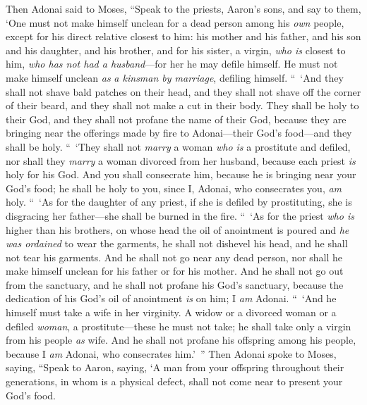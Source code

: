 \begin{biblechapter} %
 Then Adonai said to Moses, “Speak to the priests, Aaron’s sons, and say to them, ‘One must not make himself unclean for a dead person among his \textit{own} people,
\verse except for his direct relative closest to him: his mother and his father, and his son and his daughter, and his brother,
\verse and for his sister, a virgin, \textit{who is} closest to him, \textit{who has not had a husband}—for her he may defile himself.
\verse He must not make himself unclean \textit{as} \textit{a kinsman by marriage}, defiling himself.
\verse “ ‘And they shall not shave bald patches on their head, and they shall not shave off the corner of their beard, and they shall not make a cut in their body.
\verse They shall be holy to their God, and they shall not profane the name of their God, because they are bringing near the offerings made by fire to Adonai—their God’s food—and they shall be holy.
\verse “ ‘They shall not \textit{marry} a woman \textit{who is} a prostitute and defiled, nor shall they \textit{marry} a woman divorced from her husband, because each priest \textit{is} holy for his God.
\verse And you shall consecrate him, because he is bringing near your God’s food; he shall be holy to you, since I, Adonai, who consecrates you, \textit{am} holy.
\verse “ ‘As for the daughter of any priest, if she is defiled by prostituting, she is disgracing her father—she shall be burned in the fire.
\verse “ ‘As for the priest \textit{who is} higher than his brothers, on whose head the oil of anointment is poured and \textit{he was ordained} to wear the garments, he shall not dishevel his head, and he shall not tear his garments.
\verse And he shall not go near any dead person, nor shall he make himself unclean for his father or for his mother.
\verse And he shall not go out from the sanctuary, and he shall not profane his God’s sanctuary, because the dedication of his God’s oil of anointment \textit{is} on him; I \textit{am} Adonai.
\verse “ ‘And he himself must take a wife in her virginity.
\verse A widow or a divorced woman or a defiled \textit{woman}, a prostitute—these he must not take; he shall take only a virgin from his people \textit{as} wife.
\verse And he shall not profane his offspring among his people, because I \textit{am} Adonai, who consecrates him.’ ”
\verse Then Adonai spoke to Moses, saying,
\verse “Speak to Aaron, saying, ‘A man from your offspring throughout their generations, in whom is a physical defect, shall not come near to present your God’s food.

\end{biblechapter}
